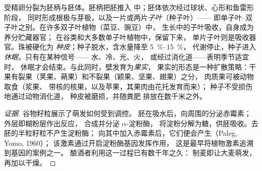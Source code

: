 \begin{definition}\label{def:b2:angiosperm-reproduction:seed}
受精卵分裂为胚柄与胚体。胚柄把胚推入
中；胚体依次经过球状、心形和鱼雷形阶段，
同时形成根极与芽极，以及一片或两片\emph{子叶}（种子叶）——
即单子叶–双子叶之别。在许多双子叶植物（菜豆、豌豆）中，
生长中的子叶吸收，自身成为养分贮藏器官；
在谷类和大多数单子叶植物中，保留下来，
单片子叶则是吸收器官。珠被硬化为
\emph{种皮}；种子脱水，含水量降至 \qtyrange{5}{15}{\%}，
代谢停止，种子进入\emph{休眠}，只有在某种信号——
水、冷、光、火，
或经过消化道——表明季节适宜时，
休眠才会结束。与此同时，壁发育为\emph{果实}，
果实的形态是一种扩散策略：干果有裂果（荚果、蒴果）和不裂果（颖果、坚果、翅果）之分，
肉质果可被动物取食（浆果、
带核的核果，以及苹果，其果肉由花托发育而来）；
种子不受损伤地通过动物消化道，
种皮被磨损，并随粪肥
排放在数千米之外。
\end{definition}
\begin{proof}[证据]
谷物籽粒展示了萌发如何受到调控。
胚在吸水后，向周围的分泌赤霉素；
外层即糊粉层作出反应，
合成并分泌 $\alpha$-淀粉酶，
将淀粉分解为糖，供胚吸收。去胚的半粒籽粒不产生淀粉酶；
向其中加入赤霉素后，它们便会产生（Paleg, Yomo, 1960）；
该激素通过开启淀粉酶基因发挥作用，
这是最早将植物激素追溯到基因的案例之一。
酿酒者利用这一过程已有数千年之久：
制麦即让大麦萌发，再加以干燥。
\end{proof}

